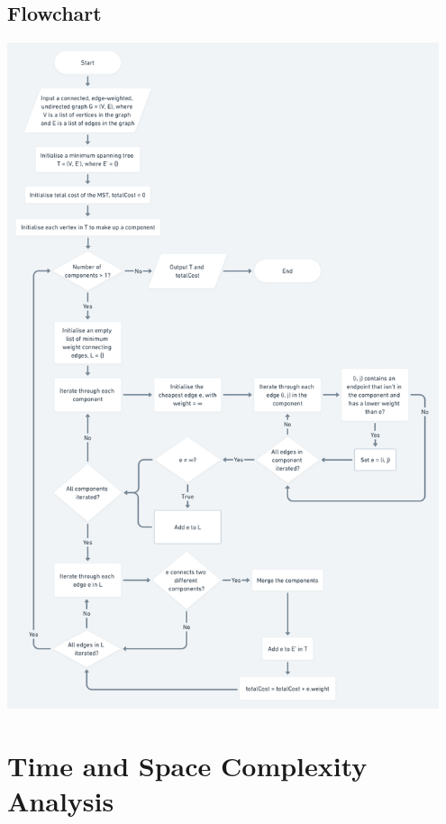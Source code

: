 \documentclass[a4paper, 11pt]{article}
\begin{document}
\subsection{Flowchart}
\includegraphics[width=0.95\textwidth]{Flowchart of Boruvka's Algorithm.png}

\section{Time and Space Complexity Analysis}
\end{document}
